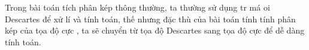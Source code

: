 \documentclass[preview]{standalone}
\begin{document}
\begin{center}
Trong bài toán tích phân kép thông thường, ta thường sử dụng tr má oi Descartes để xử lí và tính toán, thế nhưng đặc thù của bài toán tính tính phân kép của tọa độ cực , ta sẽ chuyển từ tọa độ Descartes sang tọa độ cực để dễ dàng tính toán.
\end{center}
\end{document}
